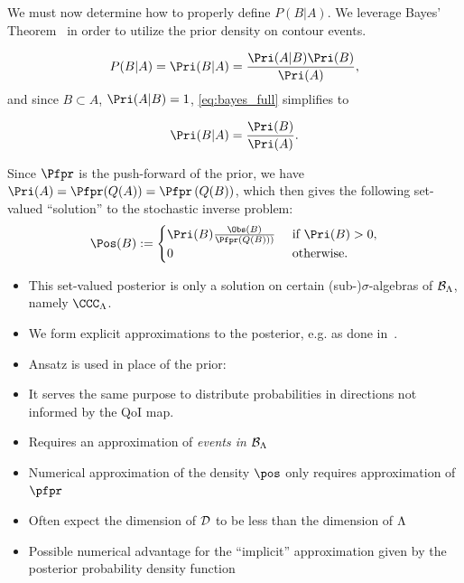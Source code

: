 \begin{frame}[t]
We must now determine how to properly define $P(B|A)$. 
We leverage Bayes' Theorem~\cite{Smith} in order to utilize the prior density on contour events.

\begin{equation}\label{eq:bayes_full}
P(B|A) = \Pri(B|A) = \frac{ \Pri(A|B) \Pri(B) }{ \Pri(A) },
\end{equation}
and since $B \subset A$, $\Pri(A|B) = 1$, \eqref{eq:bayes_full} simplifies to

\begin{equation}\label{eq:bayes}
\Pri(B|A) = \frac{ \Pri(B) }{ \Pri(A) }.
\end{equation}

Since $\Pfpr$ is the push-forward of the prior, we have $\Pri(A) = \Pfpr (Q(A)) = \Pfpr \left (Q(B)\right )$, which then gives the following set-valued ``solution'' to the stochastic inverse problem:
\begin{equation}\label{eq:sip_sol_cont}
\Pos(B) := \begin{cases}
\Pri(B) \frac{ \Obs(B) }{ \Pfpr \left (Q(B)\right ) ) } & \text{ if } \Pri(B) > 0,\\
0 & \text{ otherwise}.
\end{cases}
\end{equation}

\end{frame}

\begin{frame}[t]
\begin{itemize}
	\item <1-> This set-valued posterior is only a solution on certain (sub-)$\sigma$-algebras of $\mathcal{B}_{{\Lambda}}$, namely $\CCC_\pspace$.
	\item <1> We form explicit approximations to the posterior, e.g. as done in~\cite{BET+14, BES12, BBE11}. 
	\item <2> Ansatz is used in place of the prior:
	\item <2> It serves the same purpose to distribute probabilities in directions not informed by the QoI map.
	\item <3-> Requires an approximation of \emph{events in $\mathcal{B}_{{\Lambda}}$}
	\item <4-> Numerical approximation of the density $\pos$ only requires approximation of $\pfpr$
	\item <5-> Often expect the dimension of $\mathcal{D}$ to be less than the dimension of ${\Lambda}$
	\item <5-> Possible numerical advantage for the ``implicit'' approximation given by the posterior probability density function
\end{itemize}
\end{frame}

